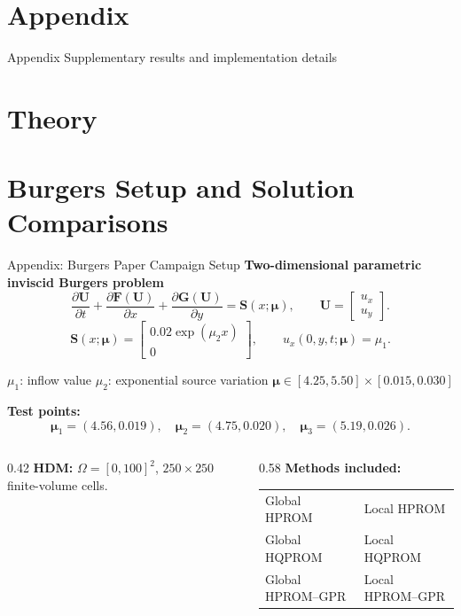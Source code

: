 \documentclass[aspectratio=169]{beamer}
\begin{document}
\appendix

\section{Appendix}

\begin{frame}{Appendix}
\centering
\Large Supplementary results and implementation details
\end{frame}

\section{Theory}
\BurgersTheoryFrames

\section{Burgers Setup and Solution Comparisons}

\begin{frame}{Appendix: Burgers Paper Campaign Setup}
\small
\textbf{Two-dimensional parametric inviscid Burgers problem}
\[
\frac{\partial \mathbf U}{\partial t}
+\frac{\partial \mathbf F(\mathbf U)}{\partial x}
+\frac{\partial \mathbf G(\mathbf U)}{\partial y}
=\mathbf S(x;\boldsymbol\mu),
\qquad
\mathbf U=
\begin{bmatrix}
u_x\\u_y
\end{bmatrix}.
\]
\[
\mathbf S(x;\boldsymbol\mu)=
\begin{bmatrix}
0.02\exp(\mu_2 x)\\0
\end{bmatrix},
\qquad
u_x(0,y,t;\boldsymbol\mu)=\mu_1.
\]

\vspace{-0.35em}
\centering
\(\mu_1\): inflow value \qquad
\(\mu_2\): exponential source variation \qquad
\(\boldsymbol\mu\in[4.25,5.50]\times[0.015,0.030]\)
\par

\vspace{0.35em}
\textbf{Test points:}
\[
\boldsymbol\mu_1=(4.56,0.019),\quad
\boldsymbol\mu_2=(4.75,0.020),\quad
\boldsymbol\mu_3=(5.19,0.026).
\]

\vspace{-0.25em}
\begin{columns}[T,onlytextwidth]
\begin{column}{0.42\textwidth}
\textbf{HDM:} $\Omega=[0,100]^2$, $250\times250$ finite-volume cells.
\end{column}
\begin{column}{0.58\textwidth}
\textbf{Methods included:}
\begin{tabular}{ll}
Global HPROM & Local HPROM \\
Global HQPROM & Local HQPROM \\
Global HPROM--GPR & Local HPROM--GPR
\end{tabular}
\end{column}
\end{columns}
\end{frame}
\end{document}
